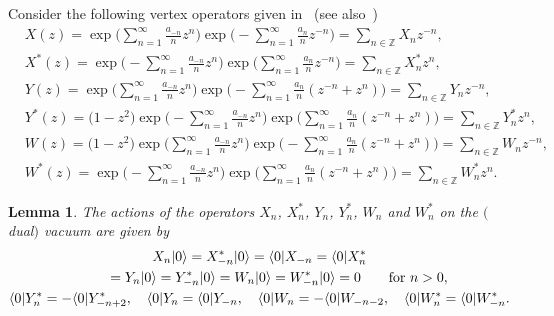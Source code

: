 \documentclass[pdftex]{sigma}
\numberwithin{equation}{section}
\newtheorem{Lemma}[Theorem]{Lemma}
\begin{document}
Consider the following vertex operators given in~\cite{Ba1996,JN2015} (see also~\cite{SZ2006})
\begin{align}
&X(z)=\exp\Biggl(\sum^\infty_{n=1}\frac{a_{-n}}{n}z^n\Biggr)\exp\Biggl(-\sum^\infty_{n=1}\frac{a_n}{n}z^{-n}\Biggr)=\sum_{n\in \mathbb{Z}}X_nz^{-n},\nonumber\\
&X^*(z)=\exp\Biggl(-\sum^\infty_{n=1}\frac{a_{-n}}{n}z^n\Biggr)\exp\Biggl(\sum^\infty_{n=1}\frac{a_n}{n}z^{-n}\Biggr)=\sum_{n\in \mathbb{Z}}X^*_nz^n,\nonumber\\
&Y(z)=\exp\Biggl(\sum^\infty_{n=1}\frac{a_{-n}}{n}z^n\Biggr)\exp\Biggl(-\sum^\infty_{n=1}\frac{a_n}{n}(z^{-n}+z^n)\Biggr)=\sum_{n\in \mathbb{Z}}Y_nz^{-n},\nonumber\\
&Y^*(z)=\big(1-z^2\big)\exp\Biggl(-\sum^\infty_{n=1}\frac{a_{-n}}{n}z^n\Biggr)\exp\Biggl(\sum^\infty_{n=1}\frac{a_n}{n}(z^{-n}+z^n)\Biggr)=\sum_{n\in \mathbb{Z}}Y^*_nz^n,\nonumber\\
&W(z)=\big(1-z^2\big)\exp\Biggl(\sum^\infty_{n=1}\frac{a_{-n}}{n}z^n\Biggr)\exp\Biggl(-\sum^\infty_{n=1}\frac{a_n}{n}(z^{-n}+z^n)\Biggr)=\sum_{n\in \mathbb{Z}}W_nz^{-n},\nonumber\\
&W^*(z)=\exp\Biggl(-\sum^\infty_{n=1}\frac{a_{-n}}{n}z^n\Biggr)\exp\Biggl(\sum^\infty_{n=1}\frac{a_n}{n}(z^{-n}+z^n)\Biggr)=\sum_{n\in \mathbb{Z}}W^*_nz^n. \label{e:ve1}
\end{align}
\begin{Lemma}The actions of the operators $X_n$, $X^*_n$, $Y_n$, $Y^*_n$, $W_n$ and $W^*_n$ on the $($dual$)$ vacuum are given by
\begin{gather}
X_n|0\rangle=X^*_{-n}|0\rangle=\langle 0|X_{-n}=\langle 0|X^*_n \nonumber\\
\label{e:re1} \hphantom{X_n|0\rangle}{}
=Y_n|0\rangle=Y^*_{-n}|0\rangle=W_n|0\rangle=W^*_{-n}|0\rangle=0 \qquad \text{for}~n>0,\\
\label{e:re2}\langle 0|Y^*_n=-\langle 0|Y^*_{-n+2},\quad \langle 0|Y_n=\langle 0|Y_{-n},\quad \langle 0|W_n=-\langle 0|W_{-n-2},\quad \langle 0|W^*_n=\langle 0|W^*_{-n}.
\end{gather}
\end{Lemma}
\end{document}
